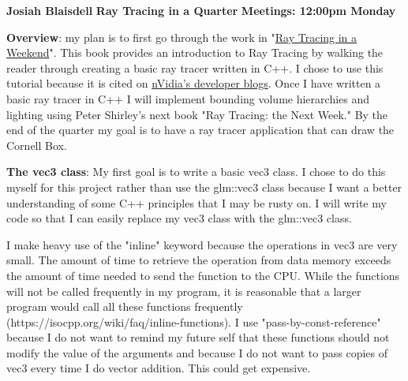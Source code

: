 \documentclass[11pt]{article}
\renewcommand{\>}{\rightarrow}
\numberwithin{equation}{section}
\begin{document}
\lstset{style=mystyle}
\pagestyle{empty}
\noindent
{\textsf{\textbf{Josiah Blaisdell}}} \hfill
{\textsf{\textbf{ Ray Tracing in a Quarter }}}
\hfill
{\textsf{\textbf{Meetings: 12:00pm Monday}}}
\underline{\hspace{6.7in}}
\vspace{.2in}


\noindent
{\textsf{\textbf{Overview}}}: my plan is to first go through the work in "\hyperlink{http://www.realtimerendering.com/raytracing/Ray\%20Tracing\%20in\%20a\%20Weekend.pdf}{Ray Tracing in a Weekend}". This book provides an introduction to Ray Tracing by walking the reader through creating a basic ray tracer written in C++. I chose to use this tutorial because it is cited on \hyperlink{https://devblogs.nvidia.com/accelerated-ray-tracing-cuda/}{nVidia's developer blogs}.  
Once I have written a basic ray tracer in C++ I will implement bounding volume hierarchies and lighting using Peter Shirley's next book "Ray Tracing: the Next Week." By the end of the quarter my goal is to have a ray tracer application that can draw the Cornell Box.


\vspace{.2in}
\noindent
{\textsf{\textbf{The vec3 class}}}: My first goal is to write a basic vec3 class. I chose to do this myself for this project rather than use the glm::vec3 class because I want a better understanding of some C++ principles that I may be rusty on. I will write my code so that I can easily replace my vec3 class with the glm::vec3 class. 

\vspace{.2in}
\noindent
I make heavy use of the "inline" keyword because the operations in vec3 are very small. The amount of time to retrieve the operation from data memory exceeds the amount of time needed to send the function to the CPU. While the functions will not be called frequently in my program, it is reasonable that a larger program would call all these functions frequently (https://isocpp.org/wiki/faq/inline-functions). I use "pass-by-const-reference" because I do not want to remind my future self that these functions should not modify the value of the arguments and because I do not want to pass copies of vec3 every time I do vector addition. This could get expensive.
\end{document}
